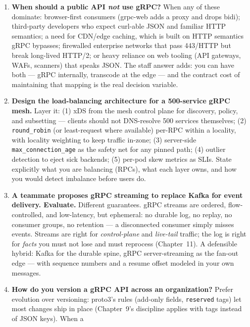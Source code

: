\begin{enumerate}[label=\textbf{Q\arabic*.}, leftmargin=1.5cm]
  \item \textbf{When should a public API \emph{not} use gRPC?}
        When any of these dominate: browser-first consumers (grpc-web adds a
        proxy and drops bidi); third-party developers who expect
        curl-able JSON and familiar HTTP semantics; a need for CDN/edge
        caching, which is built on HTTP semantics gRPC bypasses; firewalled
        enterprise networks that pass 443/HTTP but break long-lived HTTP/2;
        or heavy reliance on web tooling (API gateways, WAFs, scanners) that
        speaks JSON. The staff answer adds: you can have both --- gRPC
        internally, transcode at the edge --- and the contract cost of
        maintaining that mapping is the real decision variable.
  \item \textbf{Design the load-balancing architecture for a 500-service
        gRPC mesh.}
        Layer it: (1) xDS from the mesh control plane for discovery, policy,
        and subsetting --- clients should not DNS-resolve 500 services
        themselves; (2) \texttt{round\_robin} (or least-request where
        available) per-RPC within a locality, with locality weighting to keep
        traffic in-zone; (3) server-side \texttt{max\_connection\_age} as the
        safety net for any pinned path; (4) outlier detection to eject sick
        backends; (5) per-pod skew metrics as SLIs. State explicitly what you
        are balancing (RPCs), what each layer owns, and how you would detect
        imbalance before users do.
  \item \textbf{A teammate proposes gRPC streaming to replace Kafka for event
        delivery. Evaluate.}
        Different guarantees. gRPC streams are ordered, flow-controlled, and
        low-latency, but ephemeral: no durable log, no replay, no consumer
        groups, no retention --- a disconnected consumer simply misses events.
        Streams are right for \emph{control-plane} and \emph{live-tail}
        traffic; the log is right for \emph{facts} you must not lose and must
        reprocess (Chapter~11). A defensible hybrid: Kafka for the durable
        spine, gRPC server-streaming as the fan-out edge --- with sequence
        numbers and a resume offset modeled in your own messages.
  \item \textbf{How do you version a gRPC API across an organization?}
        Prefer evolution over versioning: proto3's rules (add-only fields,
        \texttt{reserved} tags) let most changes ship in place
        (Chapter~9's discipline applies with tags instead of JSON keys). When a

\end{enumerate}
